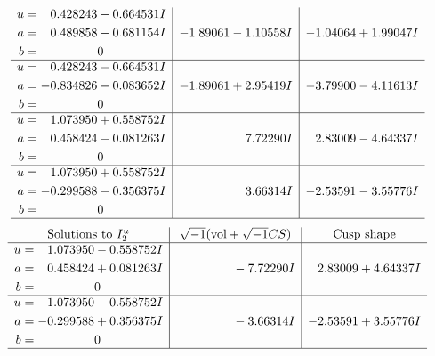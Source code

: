 \documentclass[1p]{elsarticle_modified}
\theoremstyle{definition}
\newcommand{\I}{\sqrt{-1}}
\begin{document}
$$\begin{array}{c|c|c}
\begin{aligned}
u &= \phantom{-}0.428243 - 0.664531 I \\
a &= \phantom{-}0.489858 - 0.681154 I \\
b &= \phantom{-0.000000 } 0\end{aligned}
 & -1.89061 - 1.10558 I & -1.04064 + 1.99047 I \\ \hline\begin{aligned}
u &= \phantom{-}0.428243 - 0.664531 I \\
a &= -0.834826 - 0.083652 I \\
b &= \phantom{-0.000000 } 0\end{aligned}
 & -1.89061 + 2.95419 I & -3.79900 - 4.11613 I \\ \hline\begin{aligned}
u &= \phantom{-}1.073950 + 0.558752 I \\
a &= \phantom{-}0.458424 - 0.081263 I \\
b &= \phantom{-0.000000 } 0\end{aligned}
 & \phantom{-0.000000 -}7.72290 I & \phantom{-}2.83009 - 4.64337 I \\ \hline\begin{aligned}
u &= \phantom{-}1.073950 + 0.558752 I \\
a &= -0.299588 - 0.356375 I \\
b &= \phantom{-0.000000 } 0\end{aligned}
 & \phantom{-0.000000 -}3.66314 I & -2.53591 - 3.55776 I\\
 \hline 
 \end{array}$$\newpage$$\begin{array}{c|c|c}  
\text{Solutions to }I^u_{2}& \I (\text{vol} + \sqrt{-1}CS) & \text{Cusp shape}\\
 \hline 
\begin{aligned}
u &= \phantom{-}1.073950 - 0.558752 I \\
a &= \phantom{-}0.458424 + 0.081263 I \\
b &= \phantom{-0.000000 } 0\end{aligned}
 & \phantom{-0.000000 } -7.72290 I & \phantom{-}2.83009 + 4.64337 I \\ \hline\begin{aligned}
u &= \phantom{-}1.073950 - 0.558752 I \\
a &= -0.299588 + 0.356375 I \\
b &= \phantom{-0.000000 } 0\end{aligned}
 & \phantom{-0.000000 } -3.66314 I & -2.53591 + 3.55776 I\\
 \hline 
 \end{array}$$\newpage\newpage\renewcommand{\arraystretch}{1}
\end{document}
